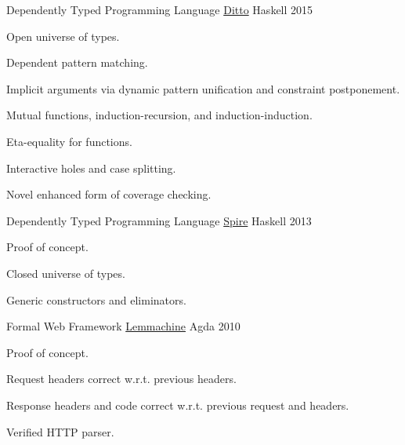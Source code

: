 

\begin{cventries}

  \cventry
    {Dependently Typed Programming Language} %
    {\href{https://github.com/ditto/ditto}{Ditto}} %
    {Haskell} %
    {2015} %
    {
      \begin{cvitems} %
        \item {Open universe of types.}
        \item {Dependent pattern matching.}
        \item {Implicit arguments via dynamic pattern unification and constraint postponement.}
        \item {Mutual functions, induction-recursion, and induction-induction.}
        \item {Eta-equality for functions.}
        \item {Interactive holes and case splitting.}
        \item {Novel enhanced form of coverage checking.}
      \end{cvitems}
    }

  \cventry
    {Dependently Typed Programming Language} %
    {\href{https://github.com/spire/spire}{Spire}} %
    {Haskell} %
    {2013} %
    {
      \begin{cvitems} %
        \item {Proof of concept.}
        \item {Closed universe of types.}
        \item {Generic constructors and eliminators.}
      \end{cvitems}
    }

  \cventry
    {Formal Web Framework} %
    {\href{https://github.com/larrytheliquid/lemmachine}{Lemmachine}} %
    {Agda} %
    {2010} %
    {
      \begin{cvitems} %
        \item {Proof of concept.}
        \item {Request headers correct w.r.t. previous headers.}
        \item {Response headers and code correct w.r.t. previous
          request and headers.}
        \item {Verified HTTP parser.}
      \end{cvitems}
    }
    

\end{cventries}
